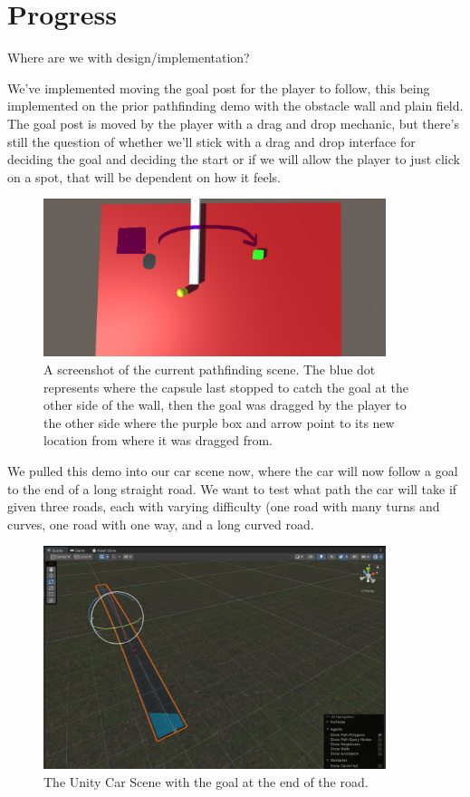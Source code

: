 \section{Progress}

Where are we with design/implementation?

We've implemented moving the goal post for the player to follow, this being implemented on the prior pathfinding demo with the obstacle wall and plain field. The goal post is moved by the player with a drag and drop mechanic, but there's still the question of whether we'll stick with a drag and drop interface for deciding the goal and deciding the start or if we will allow the player to just click on a spot, that will be dependent on how it feels. 

\begin{figure}[htb]
    \centering
    \includegraphics[width=10cm]{../Images/Update3/PathfindingDemo.png}
       \caption{A screenshot of the current pathfinding scene. The blue dot represents where the capsule last stopped to catch the goal at the other side of the wall, then the goal was dragged by the player to the other side where the purple box and arrow point to its new location from where it was dragged from.}
           \label{Fig:Pathfinding Demo 2.0}
\end{figure}

\begin{flushleft}
We pulled this demo into our car scene now, where the car will now follow a goal to the end of a long straight road. We want to test what path the car will take if given three roads, each with varying difficulty (one road with many turns and curves, one road with one way, and a long curved road.
\end{flushleft}

\begin{figure}[!ht]
    \centering
    \includegraphics[width=10cm]{../Images/Update3/CarScene.png}
       \caption{The Unity Car Scene with the goal at the end of the road.}
           \label{Fig:UnityCarScene}
\end{figure}


